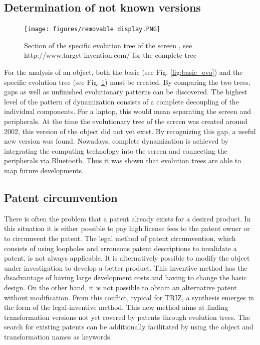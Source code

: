 \documentclass[11pt,a4paper]{article}
\begin{document}
\subsection{Determination of not known versions}

\begin{figure}[htb]
	\centering
	\texttt{[image: figures/removable display.PNG]}
	\caption{\small Section of the specific evolution tree of the screen \cite{Shpakovsky2016}, see http://www.target-invention.com/ for the complete tree}
	\label{fig:spec_evo}
\end{figure}


For the analysis of an object, both the basic (see Fig. \ref{fig:basic_evo}) and the specific evolution tree (see Fig. \ref{fig:spec_evo}) must be created. By comparing the two trees, gaps as well as unfinished evolutionary patterns can be discovered. The highest level of the pattern of dynamization consists of a complete decoupling of the individual components. For a laptop, this would mean separating the screen and peripherals. At the time the evolutionary tree of the screen was created around 2002, this version of the object did not yet exist. By recognizing this gap, a useful new version was found. Nowadays, complete dynamization is achieved by integrating the computing technology into the screen and connecting the peripherals via Bluetooth. Thus it was shown that evolution trees are able to map future developments.

\subsection{Patent circumvention}

There is often the problem that a patent already exists for a desired product. In this situation it is either possible to pay high license fees to the patent owner or to circumvent the patent.
The legal method of patent circumvention, which consists of using loopholes and erroneous patent descriptions to invalidate a patent, is not always applicable.
It is alternatively possible to modify the object under investigation to develop a better product. This inventive method has the disadvantage of having large development costs and having to change the basic design. On the other hand, it is not possible to obtain an alternative patent without modification.
From this conflict, typical for TRIZ, a synthesis emerges in the form of the legal-inventive method. This new method aims at finding transformation versions not yet covered by patents through evolution trees.
The search for existing patents can be additionally facilitated by using the object and transformation names as keywords. 
\end{document}
